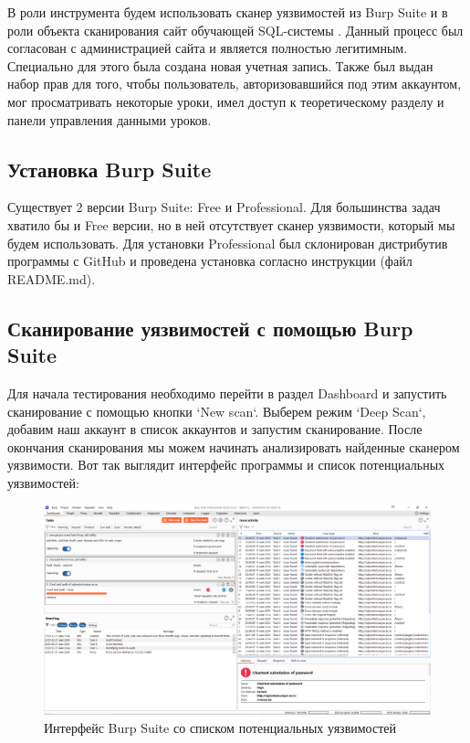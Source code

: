 \documentclass[a4paper,12pt]{diplom}
\begin{document}
	 В роли инструмента будем использовать сканер уязвимостей из Burp Suite \cite{Burp_Suite_tool} и в роли объекта сканирования сайт обучающей SQL-системы \cite{Sqlcontest_site}. Данный процесс был согласован с администрацией сайта и является полностью легитимным. Специально для этого была создана новая учетная запись. Также был выдан набор прав для того, чтобы пользователь, авторизовавшийся под этим аккаунтом, мог просматривать некоторые уроки, имел доступ к теоретическому разделу и панели управления данными уроков.
	 
	 
	 
	 \subsection{Установка Burp Suite}
	 
	 Существует 2 версии Burp Suite: Free и Professional. Для большинства задач хватило бы и Free версии, но в ней отсутствует сканер уязвимости, который мы будем использовать. Для установки Professional был склонирован дистрибутив программы с GitHub \cite{Burp_Suite_github} и проведена установка согласно инструкции (файл README.md).
	 
	 
	 
	 \subsection{Сканирование уязвимостей с помощью Burp Suite}
	 
	 Для начала тестирования необходимо перейти в раздел Dashboard и запустить сканирование с помощью кнопки `New scan`. Выберем режим `Deep Scan`, добавим наш аккаунт в список аккаунтов и запустим сканирование. После окончания сканирования мы можем начинать анализировать найденные сканером уязвимости. Вот так выглядит интерфейс программы и список потенциальных уязвимостей:
	 
	 \begin{figure}[!ht]
	 	\centering
	 	\includegraphics[width=1\textwidth]{Burp_Suite_if.png}
	 	\caption{Интерфейс Burp Suite со списком потенциальных уязвимостей}
	 	\label{fig:burp_suite_if}
	 \end{figure}
	 
\end{document}
